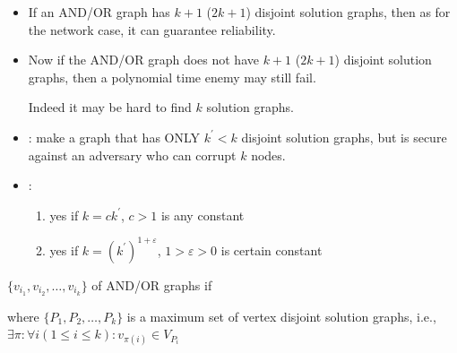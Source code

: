 \documentclass[portrait]{seminar}
\begin{document}
\newpage
{}
\begin{itemize}
\item If an AND/OR graph has $k+1$ ($2k+1$) disjoint solution
graphs, then as for the network case, it can guarantee
reliability.
\item Now if the AND/OR graph does not have $k+1$ ($2k+1$) disjoint solution
graphs, then a polynomial time enemy may still fail.

Indeed it may be hard to find $k$  solution graphs.

\item {}: make a graph that has ONLY $k^\prime<k$ disjoint
solution graphs, but is secure against an adversary
who can corrupt $k$ nodes.

\item {}: 
\begin{enumerate}
\item yes if $k=ck^\prime$, $c>1$ is any constant
\item yes if $k=(k^\prime)^{1+\varepsilon}$, $1>\varepsilon>0$
is certain constant
\end{enumerate}
\end{itemize}

\newpage
{}


$\{v_{i_1}, v_{i_2},\ldots, v_{i_k}\}$  
of AND/OR graphs if

\vskip 10pt

\vskip 10pt
\noindent
where $\{P_1, P_2, \ldots, P_k\}$ is a maximum set of vertex
disjoint solution graphs, i.e.,  $\exists \pi: \forall i
(1\le i\le k): v_{\pi(i)}\in V_{P_i}$

\newpage
{}
\end{document}
